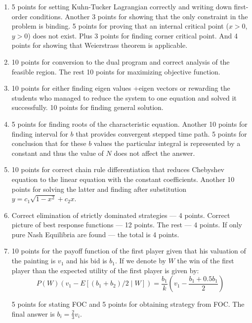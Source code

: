 \documentclass[12pt]{article} %
\theoremstyle{definition} %
\begin{document}
\begin{enumerate}
\item 5 points for setting Kuhn-Tucker Lagrangian correctly and writing down first-order conditions. Another 3 points for showing that the only constraint in the problem is binding. 5 points for proving that an internal  critical point ($x>0$, $y>0$) does not exist. Plus 3 points for finding corner critical point. And 4 points for showing that Weierstrass theorem is applicable.

\item 10 points for conversion to the dual program and correct analysis of the feasible region. The rest 10 points for maximizing objective function.

\item 10 points for either finding eigen values +eigen vectors or rewarding the students who managed to reduce the system to one equation and solved it successfully. 10 points for finding general solution.

\item 5 points for finding roots of the characteristic equation. Another 10 points for finding interval for $b$ that provides convergent stepped time path. 5 points for conclusion that for these $b$ values the particular integral is represented by a constant and thus the value of   $N$ does not affect the answer.

\item 10 points for correct chain rule differentiation that reduces Chebyshev equation to the linear equation with the constant coefficients. Another 10 points for solving the latter and finding  after substitution $y=c_1 \sqrt{1-x^2}+c_2 x$.

\item Correct elimination of strictly dominated strategies --- 4 points. Correct picture of best response functions --- 12 points. The rest --- 4 points.  If only pure Nash Equilibria are found --- the total is 4 points.

\item 10 points for the payoff function of the first player given that his valuation of the painting is $v_1$ and his bid is $b_1$. If we denote by $W$ the win of the first player than the expected utility of the first player is given by:
\[
P(W) \left( v_1 - E[(b_1+b_2)/2 \mid W] \right) = \frac{b_1}{k} \left( v_1 - \frac{b_1+0.5b_1}{2}\right)
\]

5 points for stating FOC and 5 points for obtaining strategy from FOC. The final answer is $b_i=\frac{2}{3}v_i$.

\end{enumerate}
\end{document}
